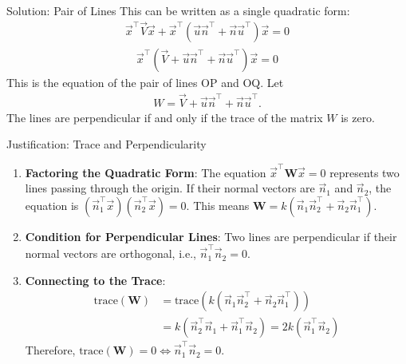 \documentclass{beamer}
\numberwithin{equation}{section}
\theoremstyle{remark}
\providecommand{\mtx}[1]{\mathbf{#1}}
\begin{document}
\begin{frame}{Solution: Pair of Lines}
This can be written as a single quadratic form:
\begin{align}
\vec{x}^\top {\vec{V}}\vec{x} + \vec{x}^\top(\vec{u}\vec{n}^\top + \vec{n}\vec{u}^\top)\vec{x} = 0 \tag{0.7}
\end{align}
\begin{align}
\vec{x}^\top( {\vec{V}} + \vec{u}\vec{n}^\top + \vec{n}\vec{u}^\top)\vec{x} = 0 \tag{0.8}
\end{align}
This is the equation of the pair of lines OP and OQ. Let 
\begin{align}
{W} =  {\vec{V}} + \vec{u}\vec{n}^\top + \vec{n}\vec{u}^\top. \tag{0.9}
\end{align}
The lines are perpendicular if and only if the trace of the matrix ${W}$ is zero.
\end{frame}

\begin{frame}{Justification: Trace and Perpendicularity}
\begin{enumerate}
    \item \textbf{Factoring the Quadratic Form}: The equation $\vec{x}^\top \mtx{W} \vec{x} = 0$ represents two lines passing through the origin. If their normal vectors are $\vec{n}_1$ and $\vec{n}_2$, the equation is $(\vec{n}_1^\top \vec{x}) (\vec{n}_2^\top \vec{x}) = 0$. This means $\mtx{W} = k(\vec{n}_1\vec{n}_2^\top + \vec{n}_2\vec{n}_1^\top)$.

    \item \textbf{Condition for Perpendicular Lines}: Two lines are perpendicular if their normal vectors are orthogonal, i.e., $\vec{n}_1^\top \vec{n}_2 = 0$.
    
    \item \textbf{Connecting to the Trace}:
    \begin{align*}
     \text{trace}(\mtx{W}) &= \text{trace}\left(k(\vec{n}_1\vec{n}_2^\top + \vec{n}_2\vec{n}_1^\top)\right) \\
     &= k \left( \vec{n}_2^\top\vec{n}_1 + \vec{n}_1^\top\vec{n}_2 \right) = 2k (\vec{n}_1^\top\vec{n}_2)
    \end{align*}
    Therefore, $\text{trace}(\mtx{W}) = 0 \iff \vec{n}_1^\top \vec{n}_2 = 0$.
\end{enumerate}
\end{frame}
\end{document}
